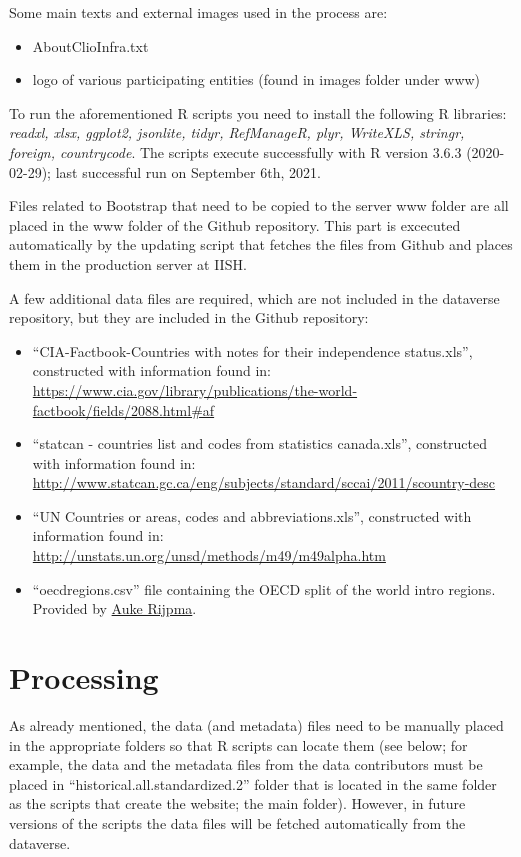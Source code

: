\documentclass[a4paper]{article}
\begin{document}
Some main texts and external images used in the process are:
\begin{itemize}
 \item AboutClioInfra.txt
 \item logo of various participating entities (found in images folder under www)
\end{itemize}

To run the aforementioned R scripts you need to install the following R 
libraries: \textit{readxl, xlsx, ggplot2, jsonlite, tidyr, RefManageR, plyr, WriteXLS, stringr, 
foreign, countrycode}. The scripts execute successfully with R version 3.6.3 (2020-02-29); last successful run on September 6th, 2021.

Files related to Bootstrap that need to be copied to the server www folder are 
all placed in the www folder of the Github repository. This part is excecuted 
automatically by the updating script that fetches the files from Github and 
places them in the production server at IISH.

A few additional data files are required, which are not included in the 
dataverse repository, but they are included in the Github repository:
\begin{itemize}
 \item ``CIA-Factbook-Countries with notes for their independence status.xls'', 
constructed with information found in: 
\url{
https://www.cia.gov/library/publications/the-world-factbook/fields/2088.html#af}
 \item ``statcan - countries list and codes from statistics canada.xls'', 
constructed with information found in: 
\url{http://www.statcan.gc.ca/eng/subjects/standard/sccai/2011/scountry-desc}
 \item ``UN Countries or areas, codes and abbreviations.xls'', constructed with 
information found in:
\url{http://unstats.un.org/unsd/methods/m49/m49alpha.htm}
\item ``oecdregions.csv'' file containing the OECD split of the world intro 
regions. Provided by \href{https://www.uu.nl/staff/ARijpma}{Auke Rijpma}.
\end{itemize}

\section{Processing}

As already mentioned, the data (and metadata) files need to be manually placed 
in the appropriate folders so that R scripts can locate them (see below; for example, the data and the metadata files from the data contributors must be placed in ``historical.all.standardized.2'' folder that is located in the same folder as the scripts that create the website; the main folder). However, in future versions of the 
scripts the data files will be fetched automatically from the dataverse.
\end{document}
